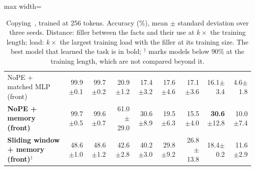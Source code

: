 \begin{table}
\begin{adjustbox}{max width=\linewidth}
\begin{tabular}{lrrrrrrrr}
NoPE + matched MLP (front) & 99.9{\scriptsize$\pm$0.1} & 99.7{\scriptsize$\pm$0.2} & 20.9{\scriptsize$\pm$1.2} & 17.4{\scriptsize$\pm$3.2} & 17.6{\scriptsize$\pm$4.6} & 17.1{\scriptsize$\pm$3.6} & 16.1{\scriptsize$\pm$3.4} & 4.6{\scriptsize$\pm$1.8} \\
\textbf{NoPE + memory (front)} & 99.7{\scriptsize$\pm$0.5} & 99.6{\scriptsize$\pm$0.7} & 61.0{\scriptsize$\pm$29.0} & 30.6{\scriptsize$\pm$8.9} & 19.5{\scriptsize$\pm$6.3} & 15.5{\scriptsize$\pm$4.0} & \textbf{30.6}{\scriptsize$\pm$12.8} & 10.0{\scriptsize$\pm$7.4} \\
\textbf{Sliding window + memory (front)$^\dagger$} & 48.6{\scriptsize$\pm$1.0} & 48.6{\scriptsize$\pm$1.2} & 42.6{\scriptsize$\pm$2.8} & 40.2{\scriptsize$\pm$3.0} & 29.8{\scriptsize$\pm$9.2} & 26.8{\scriptsize$\pm$13.8} & 18.4{\scriptsize$\pm$0.2} & 11.6{\scriptsize$\pm$2.9} \\
\bottomrule
\end{tabular}
\end{adjustbox}
\caption{Copying~\citep{arjovsky2016unitary}, trained at 256 tokens. Accuracy (\%), mean $\pm$ standard deviation over three seeds. Distance: filler between the facts and their use at $k\times$ the training length; load: $k\times$ the largest training load with the filler at its training size. The best model that learned the task is in bold; $^\dagger$ marks models below 90\% at the training length, which are not compared beyond it.}
\label{tab:copy}
\end{table}
